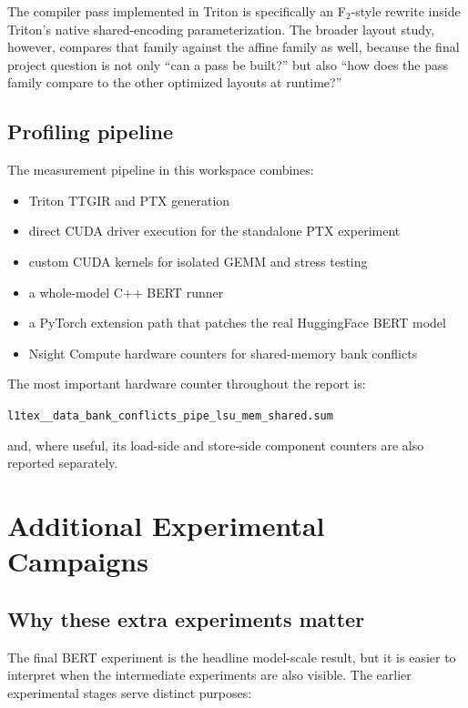 \documentclass[11pt,a4paper]{article}
\begin{document}
The compiler pass implemented in Triton is specifically an F$_2$-style rewrite
inside Triton's native shared-encoding parameterization.  The broader layout
study, however, compares that family against the affine family as well, because
the final project question is not only ``can a pass be built?'' but also ``how
does the pass family compare to the other optimized layouts at runtime?''

\subsection{Profiling pipeline}

The measurement pipeline in this workspace combines:

\begin{itemize}
\item Triton TTGIR and PTX generation
\item direct CUDA driver execution for the standalone PTX experiment
\item custom CUDA kernels for isolated GEMM and stress testing
\item a whole-model C++ BERT runner
\item a PyTorch extension path that patches the real HuggingFace BERT model
\item Nsight Compute hardware counters for shared-memory bank conflicts
\end{itemize}

The most important hardware counter throughout the report is:

\begin{center}
\texttt{l1tex\_\_data\_bank\_conflicts\_pipe\_lsu\_mem\_shared.sum}
\end{center}

and, where useful, its load-side and store-side component counters are also
reported separately.

\section{Additional Experimental Campaigns}

\subsection{Why these extra experiments matter}

The final BERT experiment is the headline model-scale result, but it is easier
to interpret when the intermediate experiments are also visible.  The earlier
experimental stages serve distinct purposes:
\end{document}

